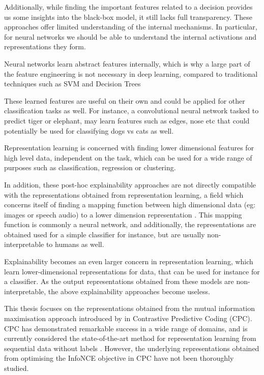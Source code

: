 	Additionally, while finding the important features related to a decision provides us some insights into the black-box model, it still lacks full transparency. These approaches offer limited understanding of the internal mechanisms. In particular, for neural networks we should be able to understand the internal activations and representations they form.
	
		Neural networks learn abstract features internally, which is why a large part of the feature engineering is not necessary in deep learning, compared to traditional techniques such as SVM and Decision Trees %
		
		These learned features are useful on their own and could be applied for other classification tasks as well. For instance, a convolutional neural network tasked to predict tiger or elephant, may learn features such as edges, nose etc that could potentially be used for classifying dogs vs cats as well. 
		
		Representation learning is concerned with finding lower dimensional features for high level data, independent on the task, which can be used for a wide range of purposes such as classification, regression or clustering.
	
	
	In addition, these post-hoc explainability approaches are not directly compatible with the representations obtained from representation learning, a field which concerns itself of finding a mapping function between high dimensional data (eg: images or speech audio) to a lower dimension representation \cite{le-khacContrastiveRepresentationLearning2020}. This mapping function is commonly a neural network, and additionally, the representations are obtained used for a simple classifier for instance, but are usually non-interpretable to humans as well. 
	
		Explainability becomes an even larger concern in representation learning, which learn lower-dimensional representations for data, that can be used for instance for a classifier. As the output representations obtained from these models are non-interpretable, the above explainability approaches become useless. 

This thesis focuses on the representations obtained from the mutual information maximisation approach introduced by \cite{oordRepresentationLearningContrastive2019} in Contrastive Predictive Coding (CPC). CPC has demonstrated remarkable success in a wide range of domains, and is currently considered the state-of-the-art method for representation learning from sequential data without labels \citep{stackeEvaluationContrastivePredictive2020, dehaanContrastivePredictiveCoding2021, luSemiSupervisedHistologyClassification2019, bhatiSegmentalContrastivePredictive2021, deldariTimeSeriesChange2021, henaffDataEfficientImageRecognition2020}. However, the underlying representations obtained from optimising the InfoNCE objective in CPC have not been thoroughly studied.

